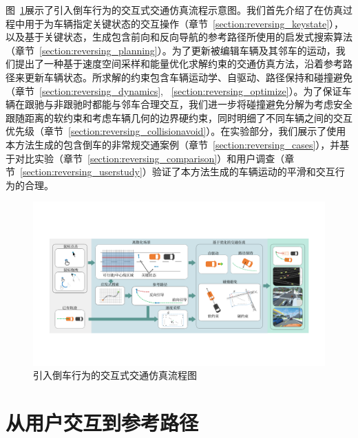 图~\ref{fig:reversing_overview}展示了引入倒车行为的交互式交通仿真流程示意图。我们首先介绍了在仿真过程中用于为车辆指定关键状态的交互操作（章节~\ref{section:reversing_keystate}），以及基于关键状态，生成包含前向和反向导航的参考路径所使用的启发式搜索算法（章节~\ref{section:reversing_planning}）。为了更新被编辑车辆及其邻车的运动，我们提出了一种基于速度空间采样和能量优化求解约束的交通仿真方法，沿着参考路径来更新车辆状态。所求解的约束包含车辆运动学、自驱动、路径保持和碰撞避免（章节~\ref{section:reversing_dynamics},  ~\ref{section:reversing_optimize}）。为了保证车辆在跟驰与非跟驰时都能与邻车合理交互，我们进一步将碰撞避免分解为考虑安全跟随距离的软约束和考虑车辆几何的边界硬约束，同时明细了不同车辆之间的交互优先级（章节~\ref{section:reversing_collisionavoid}）。在实验部分，我们展示了使用本方法生成的包含倒车的非常规交通案例（章节~\ref{section:reversing_cases}），并基于对比实验（章节~\ref{section:reversing_comparison}）和用户调查（章节~\ref{section:reversing_userstudy}）验证了本方法生成的车辆运动的平滑和交互行为的合理。

\begin{figure}[!tbh]
\centering
\includegraphics[width=\textwidth]{figure/reversing/overview v3_cn.pdf}
\caption[引入倒车行为的交互式交通仿真流程图]{
引入倒车行为的交互式交通仿真流程图
}
\label{fig:reversing_overview}
\end{figure}


\section{从用户交互到参考路径}
\label{section:reversing_discretize}

